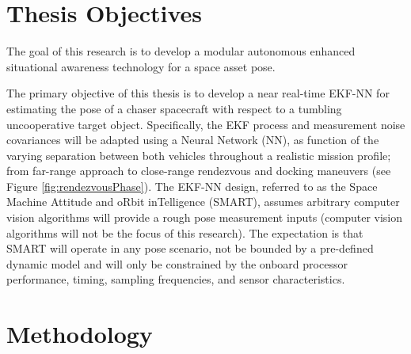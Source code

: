 \section{Thesis Objectives}\label{CHAP1_4}

The goal of this research is to develop a modular autonomous enhanced situational awareness technology for a space asset pose.

The primary objective of this thesis is to develop a near real-time EKF-NN for estimating the pose of a chaser spacecraft with respect to a tumbling uncooperative target object. Specifically, the EKF process and measurement noise covariances will be adapted using a Neural Network (NN), as function of the varying separation between both vehicles throughout a realistic mission profile; from far-range approach to close-range rendezvous and docking maneuvers (see Figure \ref{fig:rendezvousPhase}). The EKF-NN design, referred to as the Space Machine Attitude and oRbit inTelligence (SMART), assumes arbitrary computer vision algorithms will provide a rough pose measurement inputs (computer vision algorithms will not be the focus of this research). The expectation is that SMART will operate in any pose scenario, not be bounded by a pre-defined dynamic model and will only be constrained by the onboard processor performance, timing, sampling frequencies, and sensor characteristics.


\section{Methodology}\label{CHAP1_5}


